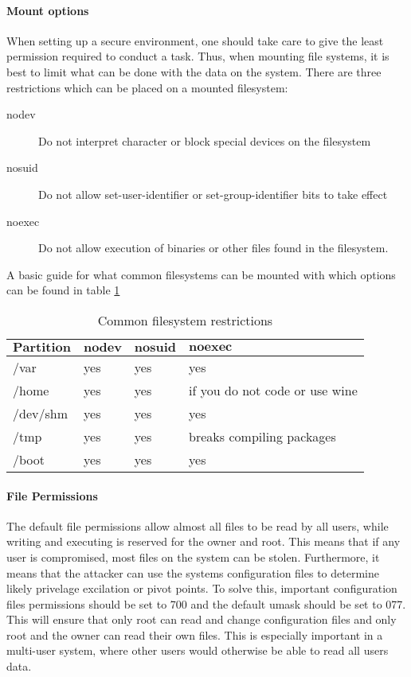 \documentclass[a4paper,11pt]{article}
\begin{document}
		\paragraph{Mount options}
			When setting up a secure environment, one should take care to give the least permission required to conduct a task. 
			Thus, when mounting file systems, it is best to limit what can be done with the data on the system.
			There are three restrictions which can be placed on a mounted filesystem:
			\begin{description}
				\item[nodev] Do not interpret character or block special devices on the filesystem
				\item[nosuid] Do not allow set-user-identifier or set-group-identifier bits to take effect
				\item[noexec] Do not allow execution of binaries or other files found in the filesystem. 
			\end{description}
			A basic guide for what common filesystems can be mounted with which options can be found in table \ref{tab:mountOptions}
			\begin{table}[htb]
				\centering
				\begin{tabular}{| l | l | l | l |}
					\hline
					$\textbf{Partition}$ & $\textbf{nodev}$ & $\textbf{nosuid}$ & $\textbf{noexec}$ \\ \hline
					/var  &		yes &	yes &	yes \\ \hline
					/home &		yes &	yes &	if you do not code or use wine \\ \hline
					/dev/shm &	yes &	yes &	yes \\ \hline
					/tmp &		yes &	yes &	breaks compiling packages \\ \hline
					/boot &		yes &	yes &	yes \\ \hline
				\end{tabular}
				\caption{Common filesystem restrictions}
				\label{tab:mountOptions}
			\end{table}
			\paragraph{File Permissions}
				The default file permissions allow almost all files to be read by all users, while writing and executing is reserved for the owner and root. 
				This means that if any user is compromised, most files on the system can be stolen. 
				Furthermore, it means that the attacker can use the systems configuration files to determine likely privelage excilation or pivot points. 
				To solve this, important configuration files permissions should be set to 700 and the default umask should be set to 077. 
				This will ensure that only root can read and change configuration files and only root and the owner can read their own files. 
				This is especially important in a multi-user system, where other users would otherwise be able to read all users data. 
\end{document}

